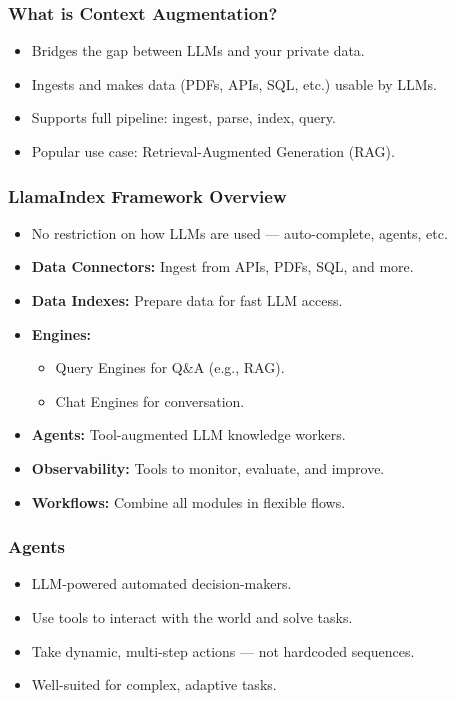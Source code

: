 \begin{frame}[fragile]\frametitle{What is Context Augmentation?}
\begin{itemize}
  \item Bridges the gap between LLMs and your private data.
  \item Ingests and makes data (PDFs, APIs, SQL, etc.) usable by LLMs.
  \item Supports full pipeline: ingest, parse, index, query.
  \item Popular use case: Retrieval-Augmented Generation (RAG).
\end{itemize}
\end{frame}



\begin{frame}[fragile]\frametitle{LlamaIndex Framework Overview}
\begin{itemize}
  \item No restriction on how LLMs are used — auto-complete, agents, etc.
  \item \textbf{Data Connectors:} Ingest from APIs, PDFs, SQL, and more.
  \item \textbf{Data Indexes:} Prepare data for fast LLM access.
  \item \textbf{Engines:} 
    \begin{itemize}
        \item Query Engines for Q\&A (e.g., RAG).
        \item Chat Engines for conversation.
    \end{itemize}
  \item \textbf{Agents:} Tool-augmented LLM knowledge workers.
  \item \textbf{Observability:} Tools to monitor, evaluate, and improve.
  \item \textbf{Workflows:} Combine all modules in flexible flows.
\end{itemize}
\end{frame}

\begin{frame}[fragile]\frametitle{Agents}
\begin{itemize}
  \item LLM-powered automated decision-makers.
  \item Use tools to interact with the world and solve tasks.
  \item Take dynamic, multi-step actions — not hardcoded sequences.
  \item Well-suited for complex, adaptive tasks.
\end{itemize}
\end{frame}

